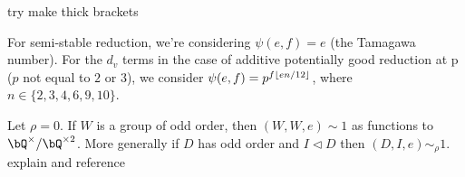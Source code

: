 {\color{red} try make thick brackets}
\begin{example}
For semi-stable reduction, we're considering $\psi(e, f) = e$ (the Tamagawa number). For the $d_v$ terms in the case of additive potentially good reduction at p ($p$ not equal to $2$ or $3$), we consider $\psi(e, f) = p^{f \lfloor e n /12\rfloor}$, where $n \in \{2,3,4,6,9,10\}$.
\end{example}

\begin{example}\label{trivial-on-brauer}
    Let $\rho = 0$. If $W$ is a group of odd order, then $(W, W, e) \sim 1$ as functions to $\bQ^{\times} / \bQ^{\times 2}$.
    More generally if $D$ has odd order and $I \triangleleft D$ then $(D, I, e) \sim_{\rho} 1$. {\color{red} explain and reference}
\end{example}


